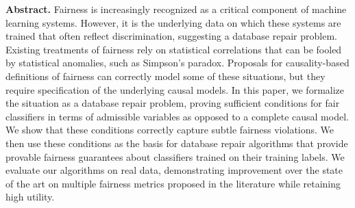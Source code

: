 \textbf{Abstract.} Fairness is increasingly recognized as a critical component of machine learning systems. However, it is the underlying data on which these systems are trained that often reflect discrimination, suggesting a database repair problem. Existing treatments of fairness rely on statistical correlations that can be fooled by statistical anomalies, such as Simpson's paradox. Proposals for causality-based definitions of fairness can correctly model some of these situations, but they require specification of the underlying causal models. In this paper, we formalize the situation as a database repair problem, proving sufficient conditions for fair classifiers in terms of admissible variables as opposed to a complete causal model. We show that these conditions correctly capture subtle fairness violations. We then use these conditions as the basis for database repair algorithms that provide provable fairness guarantees about classifiers trained on their training labels. We evaluate our algorithms on real data, demonstrating improvement over the state of the art on multiple fairness metrics proposed in the literature while retaining high utility.





~\\



\clearpage

